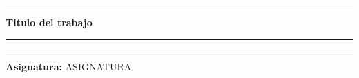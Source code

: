 \documentclass[12pt,a4paper]{article}
\begin{document}
    
\begin{titlepage}
    \vspace{0.5 cm}
    \begin{center}  
    \end{center}
    \vspace{1 cm}                  
    \rule{\textwidth}{1mm} 
    \begin{center}                              
        \Huge \bfseries \textcolor{prussianblue}{Titulo del trabajo}
    \end{center}
    \rule{\textwidth}{1mm} 
    \vspace{0.5cm}

    \begin{center}  
    \end{center}
    \vspace{1cm}
    \rule{\textwidth}{1mm} 
    \vspace{1cm}

       \hspace{1.2cm}
        \hspace{1cm}
        \begin{minipage}[b]{0.7\textwidth}
            \textbf{\normalsize\textcolor{prussianblue}{Asignatura:}} \normalsize{ASIGNATURA}
            

\end{minipage}
\end{titlepage}
\end{document}
